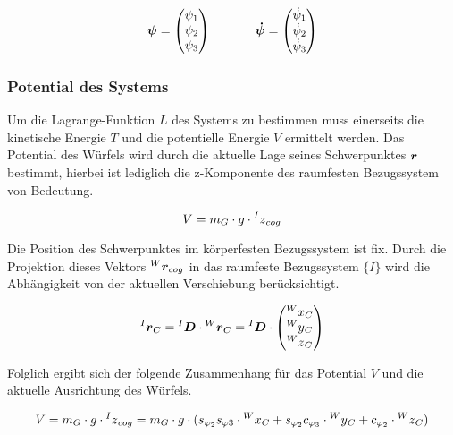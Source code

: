 \begin{equation}
\boldsymbol{\psi} = \begin{pmatrix}
{\psi}_1 \\
{\psi}_2  \\
{\psi}_3 
\end{pmatrix}
\hspace{35pt}
\boldsymbol{\dot{\psi}} = \begin{pmatrix}
\dot{\psi}_1 \\
\dot{\psi}_2  \\
\dot{\psi}_3 
\end{pmatrix}
\end{equation}

\subsubsection{Potential des Systems}
Um die Lagrange-Funktion $L$ des Systems zu bestimmen muss einerseits die kinetische Energie $T$ und die potentielle Energie $V$ ermittelt werden. Das Potential des Würfels wird durch die aktuelle Lage seines Schwerpunktes $\boldsymbol{r}$ bestimmt, hierbei ist lediglich die z-Komponente des raumfesten Bezugssystem von Bedeutung.

\begin{equation}
V = m_G \cdot g \cdot \prescript{I}{} z_{cog}
\end{equation}

Die Position des Schwerpunktes im körperfesten Bezugssystem ist fix. Durch die Projektion dieses Vektors $\prescript{W}{}{}\boldsymbol{r}_{cog}$ in das raumfeste Bezugssystem $\{I\}$ wird die Abhängigkeit von der aktuellen Verschiebung berücksichtigt.

\begin{equation}
\prescript{I}{}{}\boldsymbol{r}_C = \prescript{I}{}{}\boldsymbol{D} \cdot \prescript{W}{}{}\boldsymbol{r}_{C} = \prescript{I}{}{}\boldsymbol{D} \cdot \begin{pmatrix}
\prescript{W}{} x_C \\ \prescript{W}{} y_C \\ \prescript{W}{} z_C
\end{pmatrix}
\end{equation}

Folglich ergibt sich der folgende Zusammenhang für das Potential $V$ und die aktuelle Ausrichtung des Würfels.

\begin{equation}
V = m_G \cdot g \cdot \prescript{I}{} z_{cog} = m_G \cdot g \cdot (s_{\varphi_2}s_{\varphi3} \cdot \prescript{W}{} x_C + s_{\varphi_2}c_{\varphi_3} \cdot \prescript{W}{} y_C  + c_{\varphi_2} \cdot \prescript{W}{} z_C)
\end{equation}

